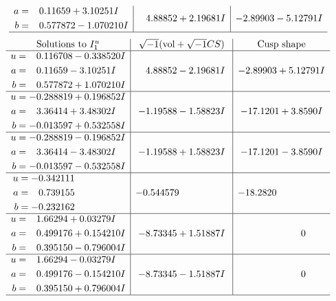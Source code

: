\documentclass[1p]{elsarticle_modified}
\theoremstyle{definition}
\newcommand{\I}{\sqrt{-1}}
\begin{document}
$$\begin{array}{c|c|c}
\begin{aligned}
a &= \phantom{-}0.11659 + 3.10251 I \\
b &= \phantom{-}0.577872 - 1.070210 I\end{aligned}
 & \phantom{-}4.88852 + 2.19681 I & -2.89903 - 5.12791 I\\
 \hline 
 \end{array}$$\newpage$$\begin{array}{c|c|c}  
\text{Solutions to }I^u_{1}& \I (\text{vol} + \sqrt{-1}CS) & \text{Cusp shape}\\
 \hline 
\begin{aligned}
u &= \phantom{-}0.116708 - 0.338520 I \\
a &= \phantom{-}0.11659 - 3.10251 I \\
b &= \phantom{-}0.577872 + 1.070210 I\end{aligned}
 & \phantom{-}4.88852 - 2.19681 I & -2.89903 + 5.12791 I \\ \hline\begin{aligned}
u &= -0.288819 + 0.196852 I \\
a &= \phantom{-}3.36414 + 3.48302 I \\
b &= -0.013597 + 0.532558 I\end{aligned}
 & -1.19588 - 1.58823 I & -17.1201 + 3.8590 I \\ \hline\begin{aligned}
u &= -0.288819 - 0.196852 I \\
a &= \phantom{-}3.36414 - 3.48302 I \\
b &= -0.013597 - 0.532558 I\end{aligned}
 & -1.19588 + 1.58823 I & -17.1201 - 3.8590 I \\ \hline\begin{aligned}
u &= -0.342111\phantom{ +0.000000I} \\
a &= \phantom{-}0.739155\phantom{ +0.000000I} \\
b &= -0.232162\phantom{ +0.000000I}\end{aligned}
 & -0.544579\phantom{ +0.000000I} & -18.2820\phantom{ +0.000000I} \\ \hline\begin{aligned}
u &= \phantom{-}1.66294 + 0.03279 I \\
a &= \phantom{-}0.499176 + 0.154210 I \\
b &= \phantom{-}0.395150 - 0.796004 I\end{aligned}
 & -8.73345 + 1.51887 I & \phantom{-0.000000 } 0 \\ \hline\begin{aligned}
u &= \phantom{-}1.66294 - 0.03279 I \\
a &= \phantom{-}0.499176 - 0.154210 I \\
b &= \phantom{-}0.395150 + 0.796004 I\end{aligned}
 & -8.73345 - 1.51887 I & \phantom{-0.000000 } 0\\
 \hline 
 \end{array}$$\newpage\newpage\renewcommand{\arraystretch}{1}
\end{document}
